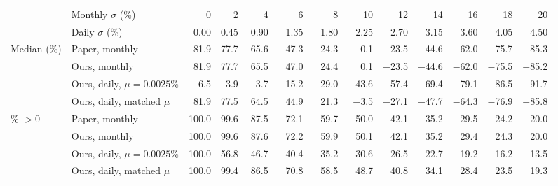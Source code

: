 \begin{tabular}{@{}llrrrrrrrrrrr@{}}
\toprule
& Monthly $\sigma$ (\%) & 0 & 2 & 4 & 6 & 8 & 10 & 12 & 14 & 16 & 18 & 20 \\
& Daily $\sigma$ (\%) & 0.00 & 0.45 & 0.90 & 1.35 & 1.80 & 2.25 & 2.70 & 3.15 & 3.60 & 4.05 & 4.50 \\ \midrule
Median (\%) & Paper, monthly & 81.9 & 77.7 & 65.6 & 47.3 & 24.3 & 0.1 & $-$23.5 & $-$44.6 & $-$62.0 & $-$75.7 & $-$85.3 \\
 & Ours, monthly & 81.9 & 77.7 & 65.5 & 47.0 & 24.4 & 0.1 & $-$23.5 & $-$44.6 & $-$62.0 & $-$75.5 & $-$85.2 \\
 & Ours, daily, $\mu = 0.0025\%$ & 6.5 & 3.9 & $-$3.7 & $-$15.2 & $-$29.0 & $-$43.6 & $-$57.4 & $-$69.4 & $-$79.1 & $-$86.5 & $-$91.7 \\
 & Ours, daily, matched $\mu$ & 81.9 & 77.5 & 64.5 & 44.9 & 21.3 & $-$3.5 & $-$27.1 & $-$47.7 & $-$64.3 & $-$76.9 & $-$85.8 \\
\addlinespace
\% $>0$ & Paper, monthly & 100.0 & 99.6 & 87.5 & 72.1 & 59.7 & 50.0 & 42.1 & 35.2 & 29.5 & 24.2 & 20.0 \\
 & Ours, monthly & 100.0 & 99.6 & 87.6 & 72.2 & 59.9 & 50.1 & 42.1 & 35.2 & 29.4 & 24.3 & 20.0 \\
 & Ours, daily, $\mu = 0.0025\%$ & 100.0 & 56.8 & 46.7 & 40.4 & 35.2 & 30.6 & 26.5 & 22.7 & 19.2 & 16.2 & 13.5 \\
 & Ours, daily, matched $\mu$ & 100.0 & 99.4 & 86.5 & 70.8 & 58.5 & 48.7 & 40.8 & 34.1 & 28.4 & 23.5 & 19.3 \\
\bottomrule
\end{tabular}
